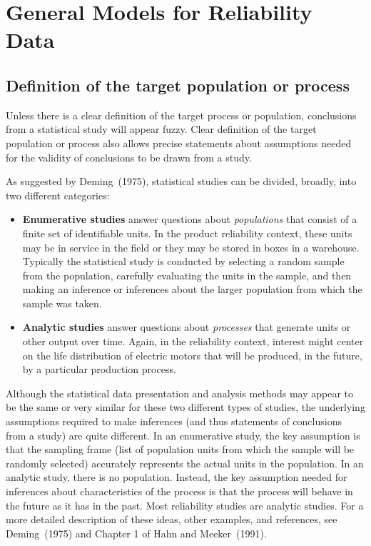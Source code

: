 \section{General Models for Reliability Data}
\label{section:general.models.for.rel.data}

\subsection{Definition of the target population or process}
\label{section:def.of.population}
Unless there is a clear definition of the target process or
population, conclusions from a statistical study will appear fuzzy.
Clear definition of the target population or process also allows
precise statements about assumptions needed for the validity
of conclusions to be drawn from a study.

As suggested by Deming~(1975), statistical studies can be divided,
broadly, into two different categories:
\begin{itemize} 
\item
{\bf Enumerative studies}  answer
questions about {\em populations} that consist of a finite set of
identifiable units.  In
the product reliability context, these units may be in service in the
field or they may be stored in boxes in a warehouse. Typically the
statistical study is conducted by selecting a random sample from the
population, carefully evaluating the units in the sample, and then making an
inference or inferences about the larger population from which the
sample was taken.
\item
{\bf Analytic studies} answer questions about 
{\em processes} that generate units or other
output over time. Again, in the reliability context,
interest might center
on the life distribution of electric motors
that will be produced, in the future, by a particular production process.
\end{itemize}
Although the statistical data presentation and analysis methods
may appear to be the same or very similar for these two different
types of studies, the underlying assumptions required to make
inferences (and thus statements of conclusions from a study)
are quite different. In an enumerative study, the key assumption
is that the sampling frame (list of population
units from which the sample will
be randomly selected) accurately represents the actual units in the
population. In an analytic study, there is no population.
Instead, the key assumption needed for inferences about characteristics 
of the process is that the process will behave in the future
as it has in the past. Most reliability studies are analytic studies.
For a more  detailed
description of these ideas, other examples, and references,
see Deming~(1975) and Chapter 1 of Hahn and Meeker~(1991).


